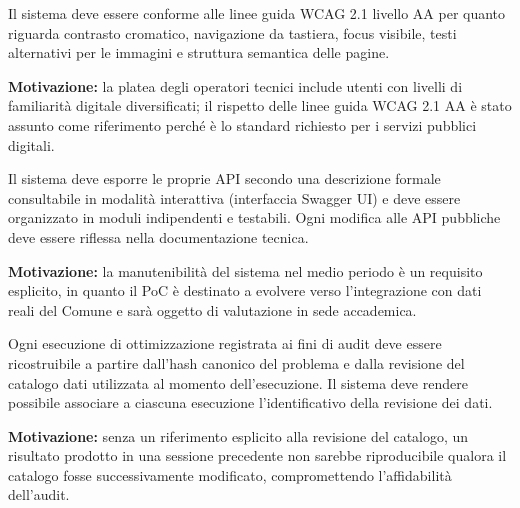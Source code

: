  \label{rnf:accessibilita}
Il sistema deve essere conforme alle linee guida WCAG 2.1 livello AA per quanto riguarda contrasto cromatico, navigazione da tastiera, focus visibile, testi alternativi per le immagini e struttura semantica delle pagine.

\textbf{Motivazione:} la platea degli operatori tecnici include utenti con livelli di familiarità digitale diversificati; il rispetto delle linee guida WCAG 2.1 AA è stato assunto come riferimento perché è lo standard richiesto per i servizi pubblici digitali.

 \label{rnf:manutenibilita}
Il sistema deve esporre le proprie API secondo una descrizione formale consultabile in modalità interattiva (interfaccia Swagger UI) e deve essere organizzato in moduli indipendenti e testabili. Ogni modifica alle API pubbliche deve essere riflessa nella documentazione tecnica.

\textbf{Motivazione:} la manutenibilità del sistema nel medio periodo è un requisito esplicito, in quanto il PoC è destinato a evolvere verso l'integrazione con dati reali del Comune e sarà oggetto di valutazione in sede accademica.

 \label{rnf:snapshot}
Ogni esecuzione di ottimizzazione registrata ai fini di audit deve essere ricostruibile a partire dall'hash canonico del problema e dalla revisione del catalogo dati utilizzata al momento dell'esecuzione. Il sistema deve rendere possibile associare a ciascuna esecuzione l'identificativo della revisione dei dati.

\textbf{Motivazione:} senza un riferimento esplicito alla revisione del catalogo, un risultato prodotto in una sessione precedente non sarebbe riproducibile qualora il catalogo fosse successivamente modificato, compromettendo l'affidabilità dell'audit.